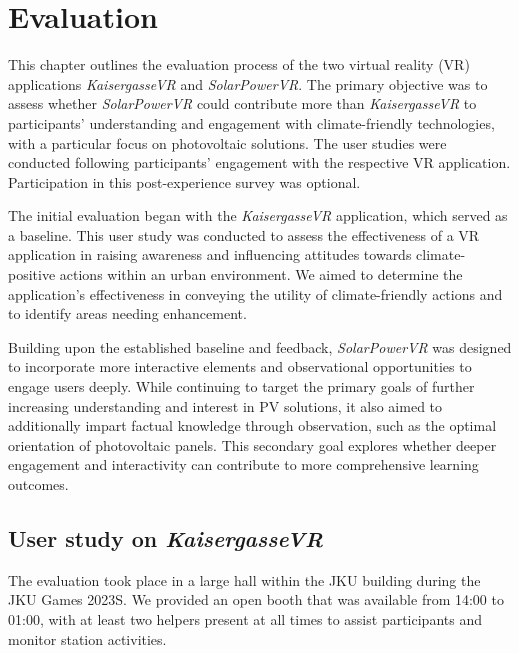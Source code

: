 \documentclass[draft, final]{vutinfth} %
\begin{document}

\chapter{Evaluation}
This chapter outlines the evaluation process of the two virtual reality (VR) applications \textit{KaisergasseVR} and \textit{SolarPowerVR}. The primary objective was to assess whether \textit{SolarPowerVR} could contribute more than \textit{KaisergasseVR} to participants' understanding and engagement with climate-friendly technologies, with a particular focus on photovoltaic solutions. The user studies were conducted following participants' engagement with the respective VR application. Participation in this post-experience survey was optional.

The initial evaluation began with the \textit{KaisergasseVR} application, which served as a baseline. This user study was conducted to assess the effectiveness of a VR application in raising awareness and influencing attitudes towards climate-positive actions within an urban environment. We aimed to determine the application's effectiveness in conveying the utility of climate-friendly actions and to identify areas needing enhancement.

Building upon the established baseline and feedback, \textit{SolarPowerVR} was designed to incorporate more interactive elements and observational opportunities to engage users deeply. While continuing to target the primary goals of further increasing understanding and interest in PV solutions, it also aimed to additionally impart factual knowledge through observation, such as the optimal orientation of photovoltaic panels. This secondary goal explores whether deeper engagement and interactivity can contribute to more comprehensive learning outcomes.

\section{User study on \textit{KaisergasseVR}}
The evaluation took place in a large hall within the JKU building during the JKU Games 2023S.  We provided an open booth that was available from 14:00 to 01:00, with at least two helpers present at all times to assist participants and monitor station activities.
\end{document}
